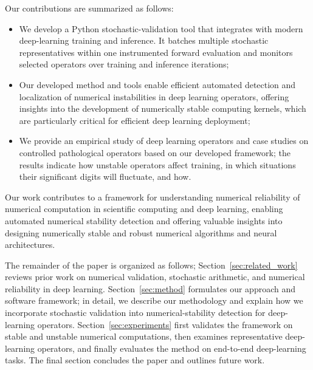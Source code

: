 \documentclass[manuscript, screen]{acmart}
\begin{document}


Our contributions are summarized as follows:
\begin{itemize}
    \item We develop a Python stochastic-validation tool that integrates with modern deep-learning training and inference. It batches multiple stochastic representatives within one instrumented forward evaluation and monitors selected operators over training and inference iterations;
    \item Our developed method and tools enable efficient automated detection and localization of numerical instabilities in deep learning operators, offering insights into the development of numerically stable computing kernels, which are particularly critical for efficient deep learning deployment;
    \item We provide an empirical study of deep learning operators and case studies on controlled pathological operators based on our developed framework; the results indicate how unstable operators affect training, in which situations their significant digits will fluctuate, and how.
\end{itemize}



Our work contributes to a framework for understanding numerical reliability of numerical computation in scientific computing and deep learning, enabling automated numerical stability detection and offering valuable insights into designing numerically stable and robust numerical algorithms and neural architectures. 


The remainder of the paper is organized as follows; Section~\ref{sec:related_work} reviews prior work on numerical validation, stochastic arithmetic, and numerical reliability in deep learning. Section~\ref{sec:method} formulates our approach and software framework; in detail, we describe our methodology and explain how we incorporate stochastic validation into numerical-stability detection for deep-learning operators. Section~\ref{sec:experiments} first validates the framework on stable and unstable numerical computations, then examines representative deep-learning operators, and finally evaluates the method on end-to-end deep-learning tasks. The final section concludes the paper and outlines future work.
\end{document}

